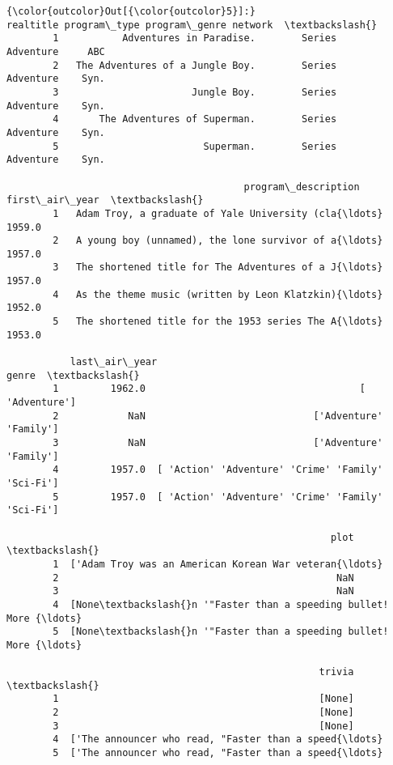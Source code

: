 \documentclass[11pt]{article}
\begin{document}
\begin{Verbatim}[commandchars=\\\{\}]
{\color{outcolor}Out[{\color{outcolor}5}]:}                            realtitle program\_type program\_genre network  \textbackslash{}
        1           Adventures in Paradise.        Series     Adventure     ABC   
        2   The Adventures of a Jungle Boy.        Series     Adventure    Syn.   
        3                       Jungle Boy.        Series     Adventure    Syn.   
        4       The Adventures of Superman.        Series     Adventure    Syn.   
        5                         Superman.        Series     Adventure    Syn.   
        
                                         program\_description  first\_air\_year  \textbackslash{}
        1   Adam Troy, a graduate of Yale University (cla{\ldots}          1959.0   
        2   A young boy (unnamed), the lone survivor of a{\ldots}          1957.0   
        3   The shortened title for The Adventures of a J{\ldots}          1957.0   
        4   As the theme music (written by Leon Klatzkin){\ldots}          1952.0   
        5   The shortened title for the 1953 series The A{\ldots}          1953.0   
        
           last\_air\_year                                              genre  \textbackslash{}
        1         1962.0                                     [ 'Adventure']   
        2            NaN                             ['Adventure' 'Family']   
        3            NaN                             ['Adventure' 'Family']   
        4         1957.0  [ 'Action' 'Adventure' 'Crime' 'Family' 'Sci-Fi']   
        5         1957.0  [ 'Action' 'Adventure' 'Crime' 'Family' 'Sci-Fi']   
        
                                                        plot  \textbackslash{}
        1  ['Adam Troy was an American Korean War veteran{\ldots}   
        2                                                NaN   
        3                                                NaN   
        4  [None\textbackslash{}n '"Faster than a speeding bullet! More {\ldots}   
        5  [None\textbackslash{}n '"Faster than a speeding bullet! More {\ldots}   
        
                                                      trivia  \textbackslash{}
        1                                             [None]   
        2                                             [None]   
        3                                             [None]   
        4  ['The announcer who read, "Faster than a speed{\ldots}   
        5  ['The announcer who read, "Faster than a speed{\ldots}   
        

\end{Verbatim}
\end{document}
